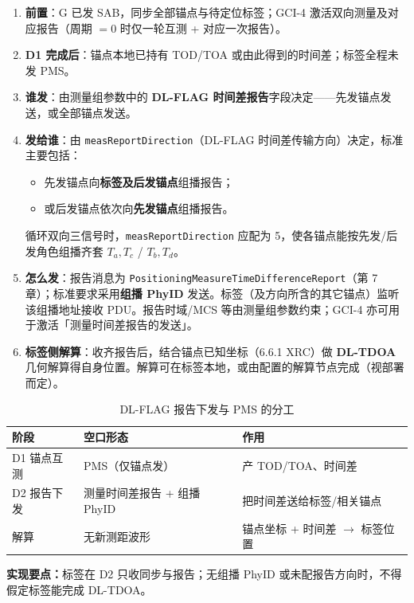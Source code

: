 \documentclass[11pt,a4paper]{ctexart}
\begin{document}
\begin{enumerate}
  \item \textbf{前置}：G 已发 SAB，同步全部锚点与待定位标签；GCI-4 激活双向测量及对应报告（周期 $=0$ 时仅一轮互测 + 对应一次报告）。
  \item \textbf{D1 完成后}：锚点本地已持有 TOD/TOA 或由此得到的时间差；标签全程未发 PMS。
  \item \textbf{谁发}：由测量组参数中的 \textbf{DL-FLAG 时间差报告}字段决定——先发锚点发送，或全部锚点发送。
  \item \textbf{发给谁}：由 \texttt{measReportDirection}（DL-FLAG 时间差传输方向）决定，标准主要包括：
  \begin{itemize}[nosep]
    \item 先发锚点向\textbf{标签及后发锚点}组播报告；
    \item 或后发锚点依次向\textbf{先发锚点}组播报告。
  \end{itemize}
  循环双向三信号时，\texttt{measReportDirection} 应配为 5，使各锚点能按先发/后发角色组播齐套 $T_a,T_c$ / $T_b,T_d$。
  \item \textbf{怎么发}：报告消息为 \texttt{PositioningMeasureTimeDifferenceReport}（第 7 章）；标准要求采用\textbf{组播 PhyID} 发送。标签（及方向所含的其它锚点）监听该组播地址接收 PDU。报告时域/MCS 等由测量组参数约束；GCI-4 亦可用于激活「测量时间差报告的发送」。
  \item \textbf{标签侧解算}：收齐报告后，结合锚点已知坐标（6.6.1 XRC）做 \textbf{DL-TDOA} 几何解算得自身位置。解算可在标签本地，或由配置的解算节点完成（视部署而定）。
\end{enumerate}

\begin{longtable}{L{2.8cm}L{5.5cm}L{5cm}}
\caption{DL-FLAG 报告下发与 PMS 的分工\label{tab:step109}} \\
\toprule
\textbf{阶段} & \textbf{空口形态} & \textbf{作用} \\
\midrule
D1 锚点互测 & PMS（仅锚点发） & 产 TOD/TOA、时间差 \\
D2 报告下发 & 测量时间差报告 + 组播 PhyID & 把时间差送给标签/相关锚点 \\
解算 & 无新测距波形 & 锚点坐标 + 时间差 $\rightarrow$ 标签位置 \\
\bottomrule
\end{longtable}

\noindent\textbf{实现要点：}标签在 D2 只收同步与报告；无组播 PhyID 或未配报告方向时，不得假定标签能完成 DL-TDOA。

\end{document}
